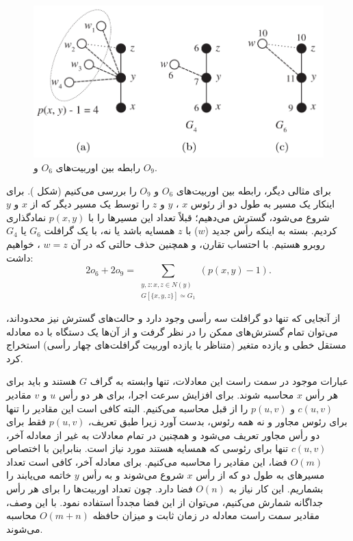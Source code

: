 \begin{figure}[b]
\centering
\includegraphics[scale=0.3]{./4-node-graphlet-2.png}
\caption{رابطه بین اوربیت‌های $O_6$ و $O_9$.}
\label{fig:o6-o9-relation}
\end{figure}

برای مثالی دیگر، رابطه بین اوربیت‌های $O_6$ و $O_9$ را بررسی می‌کنیم (شکل ). برای اینکار یک مسیر به طول دو از رئوس $x$ ، $y$ و $z$ را توسط یک مسیر دیگر که از $x$ و $y$ شروع می‌شود، گسترش می‌دهیم؛ قبلاً تعداد این مسیرها را با $p(x,y)$ نمادگذاری کردیم. بسته به اینکه رأس جدید ($w$) با $z$ همسایه باشد یا نه، با یک گرافلت $G_6$ یا $G_4$ روبرو هستیم. با احتساب تقارن، و همچنین حذف حالتی که در آن $w=z$ ، خواهیم داشت:
\begin{equation*}
2o_6+2o_9 = \sum_{\substack{y,z: x,z\in N(y)\\G[\{x,y,z\}] \simeq G_1 }}(p(x,y) - 1).
\end{equation*}

از آنجایی که تنها دو گرافلت سه رأسی وجود دارد و حالت‌های گسترش نیز محدود‌اند، می‌توان تمام گسترش‌های ممکن را در نظر گرفت و از آن‌ها یک دستگاه با ده معادله مستقل خطی و یازده متغیر (متناظر با یازده اوربیت گرافلت‌های چهار رأسی) استخراج کرد.

عبارات موجود در سمت راست این معادلات، تنها وابسته به گراف $G$ هستند و باید برای هر رأس $x$ محاسبه شوند. برای افزایش سرعت اجرا، برای هر دو رأس $u$ و $v$ مقادیر $c(u,v)$ و $p(u,v)$ را از قبل محاسبه می‌کنیم. البته کافی است این مقادیر را تنها برای رئوس مجاور و نه همه رئوس، بدست آورد زیرا طبق تعریف، $p(u,v)$ فقط برای دو رأس مجاور تعریف می‌شود و همچنین در تمام معادلات به غیر از معادله آخر، $c(u,v)$ تنها برای رئوسی که همسایه هستند مورد نیاز است. بنابراین با اختصاص $O(m)$ فضا، این مقادیر را محاسبه می‌کنیم. برای معادله آخر، کافی است تعداد مسیر‌های به طول دو که از رأس $x$ شروع می‌شوند و به رأس $y$ خاتمه می‌یابند را بشماریم. این کار نیاز به $O(n)$ فضا دارد. چون تعداد اوربیت‌ها را برای هر رأس جداگانه شمارش می‌کنیم، می‌توان از این فضا مجدداً استفاده نمود. با این وصف، مقادیر سمت راست معادله در زمان ثابت و میزان حافظه $O(m+n)$ محاسبه می‌شوند.

